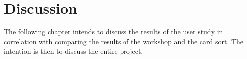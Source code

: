 \chapter{Discussion}
\label{Discussion}
The following chapter intends to discuss the results of the user study in correlation with comparing the results of the workshop and the card sort. The intention is then to discuss the entire project.
